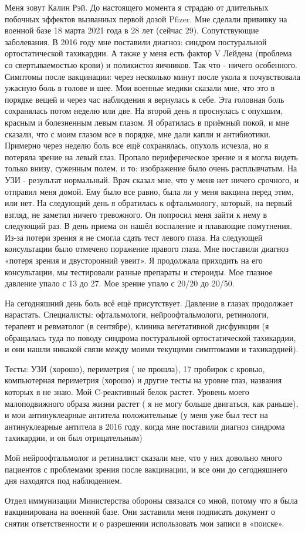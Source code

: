 Меня зовут Калин Рэй. До настоящего момента я страдаю от длительных побочных
эффектов вызванных первой дозой Pfizer. Мне сделали прививку на военной базе 18
марта 2021 года в 28 лет (сейчас 29). Сопутствующие заболевания. В 2016 году мне
поставили диагноз: синдром постуральной ортостатической тахикардии. А также у
меня есть фактор V Лейдена (проблема со свертываемостью крови) и поликистоз
яичников. Так что - ничего особенного. Симптомы после вакцинации: через
несколько минут после укола я почувствовала ужасную боль в голове и шее. Мои
военные медики сказали мне, что это в порядке вещей и через час наблюдения я
вернулась к себе. Эта головная боль сохранялась потом неделю или две. На второй
день я проснулась с опухшим, красным и болезненным левым глазом. Я обратилась в
приёмный покой, и мне сказали, что с моим глазом все в порядке, мне дали капли и
антибиотики. Примерно через неделю боль все ещё сохранялась, опухоль исчезла, но
я потеряла зрение на левый глаз. Пропало периферическое зрение и я могла видеть
только внизу, суженным полем, и то: изображение было очень расплывчатым. На УЗИ
- результат нормальный. Врач сказал мне, что у меня нет ничего срочного, и
отправил меня домой. Ему было все равно, была ли у меня вакцина перед этим, или
нет. На следующий день я обратилась к офтальмологу, который, на первый взгляд,
не заметил ничего тревожного. Он попросил меня зайти к нему в следующий раз. В
день приема он нашёл воспаление и плавающие помутнения. Из-за потери зрения я не
смогла сдать тест левого глаза. На следующей консультации было отмечено
поражение правого глаза. Мне поставили диагноз «потеря зрения и двусторонний
увеит». Я продолжала приходить на его консультации, мы тестировали разные
препараты и стероиды. Мое глазное давление упало с 13 до 27. Мое зрение упало с
20/20 до 20/50.

На сегодняшний день боль всё ещё присутствует. Давление в глазах продолжает
нарастать. Специалисты: офтальмологи, нейроофтальмологи, ретинологи, терапевт и
ревматолог (в сентябре), клиника вегетативной дисфункции (я обращалась туда по
поводу синдрома постуральной ортостатической тахикардии, и они нашли никакой
связи между моими текущими симптомами и тахикардией).

Тесты: УЗИ (хорошо), периметрия ( не прошла), 17 пробирок с кровью, компьютерная
периметрия (хорошо) и другие тесты на уровне глаз, названия которых я не
знаю. Мой C-реактивный белок растет. Уровень моего малоподвижного образа жизни
растет ( я не могу больше двигаться, как раньше), и мои антинуклеарные антитела
положительные (у меня уже был тест на антинуклеарные антитела в 2016 году, когда
мне поставили диагноз синдрома тахикардии, и он был отрицательным)

Мой нейроофтальмолог и ретиналист сказали мне, что у них довольно много
пациентов с проблемами зрения после вакцинации, и все они до сегодняшнего дня
находятся под наблюдением.

Отдел иммунизации Министерства обороны связался со мной, потому что я была
вакцинирована на военной базе. Они заставили меня подписать документ о снятии
ответственности и о разрешении использовать мои записи в «поиске».

